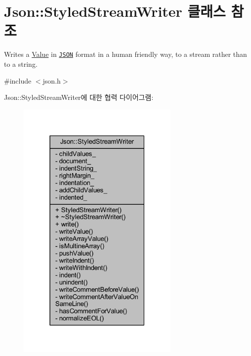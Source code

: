 \hypertarget{class_json_1_1_styled_stream_writer}{}\section{Json\+:\+:Styled\+Stream\+Writer 클래스 참조}
\label{class_json_1_1_styled_stream_writer}


Writes a \hyperlink{class_json_1_1_value}{Value} in \href{http://www.json.org}{\tt J\+S\+ON} format in a human friendly way, to a stream rather than to a string.  




{\ttfamily \#include $<$json.\+h$>$}



Json\+:\+:Styled\+Stream\+Writer에 대한 협력 다이어그램\+:\nopagebreak
\begin{figure}[H]
\begin{center}
\leavevmode
\includegraphics[width=223pt]{class_json_1_1_styled_stream_writer__coll__graph}
\end{center}
\end{figure}

